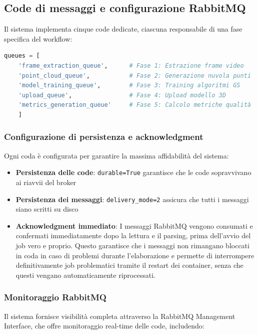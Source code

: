 \subsection{Code di messaggi e configurazione RabbitMQ}

Il sistema implementa cinque code dedicate, ciascuna responsabile di una fase specifica del workflow:

\begin{lstlisting}[language=python, caption=Definizione code specializzate per workflow]
	queues = [
	'frame_extraction_queue',      # Fase 1: Estrazione frame video
	'point_cloud_queue',           # Fase 2: Generazione nuvola punti  
	'model_training_queue',        # Fase 3: Training algoritmi GS
	'upload_queue',                # Fase 4: Upload modello 3D
	'metrics_generation_queue'     # Fase 5: Calcolo metriche qualità
	]
\end{lstlisting}

\subsubsection{Configurazione di persistenza e acknowledgment}

Ogni coda è configurata per garantire la massima affidabilità del sistema:

\begin{itemize}
	\item \textbf{Persistenza delle code}: \texttt{durable=True} garantisce che le code sopravvivano ai riavvii del broker
	\item \textbf{Persistenza dei messaggi}: \texttt{delivery\_mode=2} assicura che tutti i messaggi siano scritti su disco
	\item \textbf{Acknowledgment immediato}: I messaggi RabbitMQ vengono consumati e confermati immediatamente dopo la lettura e il parsing, prima dell'avvio del job vero e proprio. Questo garantisce che i messaggi non rimangano bloccati in coda in caso di problemi durante l'elaborazione e permette di interrompere definitivamente job problematici tramite il restart dei container, senza che questi vengano automaticamente riprocessati.
\end{itemize}

\subsubsection{Monitoraggio RabbitMQ}

Il sistema fornisce visibilità completa attraverso la RabbitMQ Management Interface, che offre monitoraggio real-time delle code, includendo:

